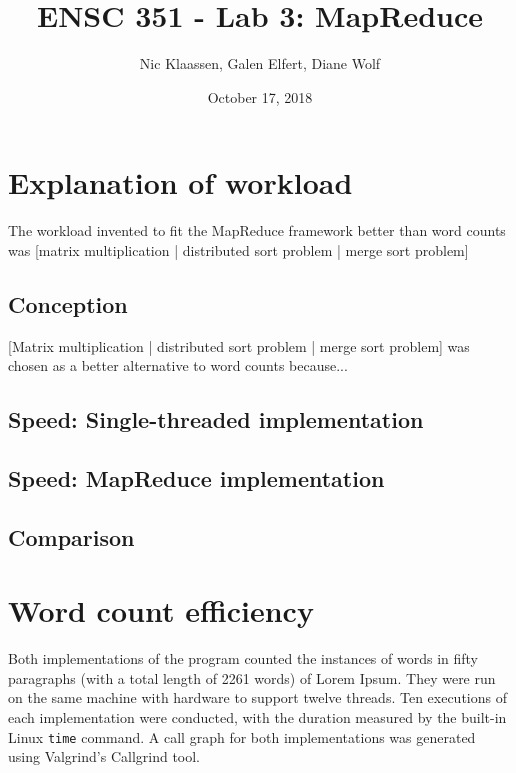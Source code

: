 \documentclass[12pt, letterpaper]{article}
\begin{document}
\title{ENSC 351 - Lab 3: MapReduce}
\date{October 17, 2018}
\author{Nic Klaassen, Galen Elfert, Diane Wolf}
\maketitle
\section{Explanation of workload}
	The workload invented to fit the MapReduce framework better than word counts was {[matrix multiplication | distributed sort problem | merge sort problem]}
\subsection{Conception}
	{[Matrix multiplication | distributed sort problem | merge sort problem]} was chosen as a better alternative to word counts because...
\subsection{Speed: Single-threaded implementation}
	
\subsection{Speed: MapReduce implementation}
\subsection{Comparison}
\section{Word count efficiency}
	Both implementations of the program counted the instances of words in fifty paragraphs (with a total length of 2261 words) of Lorem Ipsum. They were run on the same machine with hardware to support twelve threads. Ten executions of each implementation were conducted, with the duration measured by the built-in Linux \texttt{time} command. A call graph for both implementations was generated using Valgrind's Callgrind tool.
\end{document}
